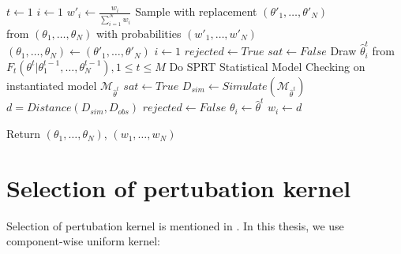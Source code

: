 \begin{algorithm}                     
\begin{algorithmic}[H]
        \State $t \leftarrow 1$
            \State $i \leftarrow 1$ 
                \State $w'_i \leftarrow \frac{w_i}{\sum_{i=1}^N w_i} $
            \EndWhile
            \State Sample with replacement $(\theta'_1,\ldots,\theta'_N)$  \\\hspace{1.5cm} from $(\theta_1,\ldots,\theta_N)$ with probabilities $(w'_1,\ldots,w'_N)$ 
            \State $(\theta_1,\ldots,\theta_N) \leftarrow (\theta'_1,\ldots,\theta'_N)$ 
            \State $i \leftarrow 1$
             
                \State $rejected \leftarrow True$
                    \State $sat \leftarrow False $
                        \State Draw $\hat{\theta}^t_i$ from $F_t(\theta^t | \theta^{t-1}_1,\ldots,\theta^{t-1}_N), 1\leq t \leq M$
                        \State Do SPRT Statistical Model Checking on instantiated model $\mathcal{M}_{\hat{\theta}^t}$
                            \State $sat \leftarrow True$
                        \EndIf
                    \EndWhile
                    \State $D_{sim} \leftarrow Simulate(\mathcal{M}_{\hat{\theta}^t})$
                    \State $d = Distance(D_{sim}, D_{obs})$
                        \State $rejected \leftarrow False$
                        \State $\theta_i \leftarrow \hat{\theta}^t$
                        \State $w_i \leftarrow d$
                    \EndIf
                    
                \EndWhile
            \EndWhile
        \EndWhile
        \State Return $(\theta_1,\ldots,\theta_{N})$, $(w_1,\ldots,w_{N})$
        \EndProcedure
    \end{algorithmic}
\end{algorithm}

\section{Selection of pertubation kernel}
Selection of pertubation kernel is mentioned in \cite{filippi2013optimality}. In this thesis, we use
component-wise uniform kernel:

